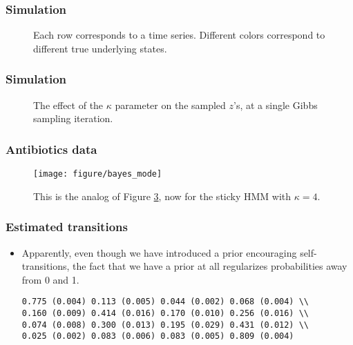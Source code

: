 \documentclass{beamer}
\begin{document}
\begin{frame}
  \frametitle{Simulation}
  \begin{figure}
    \centering
    \qquad
    \caption{Each row corresponds to a time series. Different colors correspond
      to different true underlying states.}
    \label{fig:sticky_hmm_kappas}
  \end{figure}

\end{frame}

\begin{frame}
  \frametitle{Simulation}
  \begin{figure}
    \centering
    \qquad
    \caption{The effect of the $\kappa$ parameter on the sampled $z$'s, at a
      single Gibbs sampling iteration.}
    \label{fig:sticky_hmm_kappas}
  \end{figure}
\end{frame}

\begin{frame}
  \frametitle{Antibiotics data}
  \begin{figure}[ht]
    \centering
    \texttt{[image: figure/bayes\_mode]}
    \caption{This is the analog of Figure \ref{fig:hmm_mode}, now for the sticky
      HMM with $\kappa = 4$. \label{fig:hmm_mode} }
  \end{figure}
\end{frame}

\begin{frame}
  \frametitle{Estimated transitions}
  \begin{itemize}
    \item Apparently, even though we have introduced a prior encouraging
      self-transitions, the fact that we have a prior at all regularizes
      probabilities away from 0 and 1.
\begin{verbatim} 
0.775 (0.004) 0.113 (0.005) 0.044 (0.002) 0.068 (0.004) \\
0.160 (0.009) 0.414 (0.016) 0.170 (0.010) 0.256 (0.016) \\ 
0.074 (0.008) 0.300 (0.013) 0.195 (0.029) 0.431 (0.012) \\
0.025 (0.002) 0.083 (0.006) 0.083 (0.005) 0.809 (0.004) 
\end{verbatim}
  \end{itemize}
\end{frame}
\end{document}
